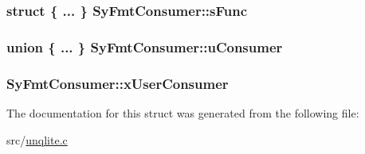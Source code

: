 \hypertarget{struct_sy_fmt_consumer_afe9b1d05c8fc8cd88253eb6f2fb24469}{
\subsubsection[{s\-Func}]{\setlength{\rightskip}{0pt plus 5cm}struct \{ ... \}  Sy\-Fmt\-Consumer\-::s\-Func}}\label{d0/d51/struct_sy_fmt_consumer_afe9b1d05c8fc8cd88253eb6f2fb24469}
\hypertarget{struct_sy_fmt_consumer_ae448f0d7174a2cb27abad82989127eba}{
\subsubsection[{u\-Consumer}]{\setlength{\rightskip}{0pt plus 5cm}union \{ ... \}  Sy\-Fmt\-Consumer\-::u\-Consumer}}\label{d0/d51/struct_sy_fmt_consumer_ae448f0d7174a2cb27abad82989127eba}
\hypertarget{struct_sy_fmt_consumer_abd473394ab5aae306df7edac62160338}{
\subsubsection[{x\-User\-Consumer}]{ Sy\-Fmt\-Consumer\-::x\-User\-Consumer}}\label{d0/d51/struct_sy_fmt_consumer_abd473394ab5aae306df7edac62160338}


The documentation for this struct was generated from the following file\-:\begin{DoxyCompactItemize}
\item 
src/\hyperlink{unqlite_8c}{unqlite.\-c}\end{DoxyCompactItemize}
